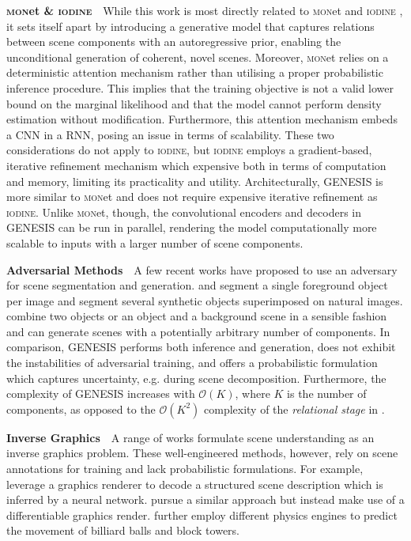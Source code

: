 \documentclass{article}
\begin{document}
\clearpage

\textbf{\textsc{mon}et \& \textsc{iodine}}\ \
While this work is most directly related to \textsc{mon}et \citep{burgess2019monet} and \mbox{\textsc{iodine}} \citep{greff2019multi}, it sets itself apart by introducing a generative model that captures relations between scene components with an autoregressive prior, enabling the unconditional generation of coherent, novel scenes.
Moreover, \textsc{mon}et relies on a deterministic attention mechanism rather than utilising a proper probabilistic inference procedure.
This implies that the training objective is not a valid lower bound on the marginal likelihood and that the model cannot perform density estimation without modification.
Furthermore, this attention mechanism embeds a \gls{CNN} in a \gls{RNN}, posing an issue in terms of scalability.
These two considerations do not apply to \textsc{iodine}, but \textsc{iodine} employs a gradient-based, iterative refinement mechanism which expensive both in terms of computation and memory, limiting its practicality and utility.
Architecturally, \gls{GENESIS} is more similar to \textsc{mon}et and does not require expensive iterative refinement as \textsc{iodine}.
Unlike \textsc{mon}et, though, the convolutional encoders and decoders in \gls{GENESIS} can be run in parallel, rendering the model computationally more scalable to inputs with a larger number of scene components.




\textbf{Adversarial Methods}\ \
A few recent works have proposed to use an adversary for scene segmentation and generation.
\citet{chen2019unsupervised} and \citet{bielski2019emergence} segment a single foreground object per image and \citet{arandjelovic2019object} segment several synthetic objects superimposed on natural images.
\citet{azadicompositional} combine two objects or an object and a background scene in a sensible fashion and \citet{van2018case} can generate scenes with a potentially arbitrary number of components.
In comparison, \gls{GENESIS} performs both inference and generation, does not exhibit the instabilities of adversarial training, and offers a probabilistic formulation which captures uncertainty, e.g. during scene decomposition.
Furthermore, the complexity of \gls{GENESIS} increases with $\mathcal{O}(K)$, where $K$ is the number of components, as opposed to the $\mathcal{O}(K^2)$ complexity of the \emph{relational stage} in \citet{van2018case}.

\textbf{Inverse Graphics}\ \ 
A range of works formulate scene understanding as an inverse graphics problem.
These well-engineered methods, however, rely on scene annotations for training and lack probabilistic formulations.
For example, \citet{wu2017neural} leverage a graphics renderer to decode a structured scene description which is inferred by a neural network.
\citet{romaszko2017vision} pursue a similar approach but instead make use of a differentiable graphics render.
\citet{wu2017learning} further employ different physics engines to predict the movement of billiard balls and block towers.
\end{document}
